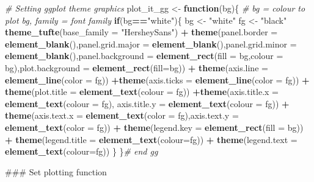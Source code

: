 \documentclass[10,portrait]{article}
\newenvironment{Shaded}{\begin{snugshade}}{\end{snugshade}}
\newcommand{\KeywordTok}[1]{\textcolor[rgb]{0.13,0.29,0.53}{\textbf{#1}}}
\newcommand{\DataTypeTok}[1]{\textcolor[rgb]{0.13,0.29,0.53}{#1}}
\newcommand{\StringTok}[1]{\textcolor[rgb]{0.31,0.60,0.02}{#1}}
\newcommand{\CommentTok}[1]{\textcolor[rgb]{0.56,0.35,0.01}{\textit{#1}}}
\newcommand{\ControlFlowTok}[1]{\textcolor[rgb]{0.13,0.29,0.53}{\textbf{#1}}}
\newcommand{\OperatorTok}[1]{\textcolor[rgb]{0.81,0.36,0.00}{\textbf{#1}}}
\newcommand{\NormalTok}[1]{#1}
\begin{document}
\begin{Shaded}
\begin{Highlighting}[]
\CommentTok{# Setting ggplot theme graphics}
\NormalTok{plot_it_gg <-}\StringTok{ }\ControlFlowTok{function}\NormalTok{(bg)\{ }\CommentTok{# bg = colour to plot bg, family = font family}
  \ControlFlowTok{if}\NormalTok{(bg}\OperatorTok{==}\StringTok{"white"}\NormalTok{)\{}
\NormalTok{    bg <-}\StringTok{ "white"}
\NormalTok{    fg <-}\StringTok{ "black"}
    \KeywordTok{theme_tufte}\NormalTok{(}\DataTypeTok{base_family =} \StringTok{"HersheySans"}\NormalTok{) }\OperatorTok{+}
\StringTok{      }\KeywordTok{theme}\NormalTok{(}\DataTypeTok{panel.border =} \KeywordTok{element_blank}\NormalTok{(),}\DataTypeTok{panel.grid.major =} \KeywordTok{element_blank}\NormalTok{(),}\DataTypeTok{panel.grid.minor =} \KeywordTok{element_blank}\NormalTok{(),}\DataTypeTok{panel.background =} \KeywordTok{element_rect}\NormalTok{(}\DataTypeTok{fill =}\NormalTok{ bg,}\DataTypeTok{colour =}\NormalTok{ bg),}\DataTypeTok{plot.background =} \KeywordTok{element_rect}\NormalTok{(}\DataTypeTok{fill=}\NormalTok{bg)) }\OperatorTok{+}
\StringTok{      }\KeywordTok{theme}\NormalTok{(}\DataTypeTok{axis.line =} \KeywordTok{element_line}\NormalTok{(}\DataTypeTok{color =}\NormalTok{ fg)) }\OperatorTok{+}\KeywordTok{theme}\NormalTok{(}\DataTypeTok{axis.ticks =} \KeywordTok{element_line}\NormalTok{(}\DataTypeTok{color =}\NormalTok{ fg)) }\OperatorTok{+}\StringTok{ }\KeywordTok{theme}\NormalTok{(}\DataTypeTok{plot.title =} \KeywordTok{element_text}\NormalTok{(}\DataTypeTok{colour =}\NormalTok{ fg)) }\OperatorTok{+}\KeywordTok{theme}\NormalTok{(}\DataTypeTok{axis.title.x =} \KeywordTok{element_text}\NormalTok{(}\DataTypeTok{colour =}\NormalTok{ fg), }\DataTypeTok{axis.title.y =} \KeywordTok{element_text}\NormalTok{(}\DataTypeTok{colour =}\NormalTok{ fg)) }\OperatorTok{+}\StringTok{ }\KeywordTok{theme}\NormalTok{(}\DataTypeTok{axis.text.x =} \KeywordTok{element_text}\NormalTok{(}\DataTypeTok{color =}\NormalTok{ fg),}\DataTypeTok{axis.text.y =} \KeywordTok{element_text}\NormalTok{(}\DataTypeTok{color =}\NormalTok{ fg)) }\OperatorTok{+}\StringTok{ }\KeywordTok{theme}\NormalTok{(}\DataTypeTok{legend.key =} \KeywordTok{element_rect}\NormalTok{(}\DataTypeTok{fill =}\NormalTok{ bg)) }\OperatorTok{+}\StringTok{ }\KeywordTok{theme}\NormalTok{(}\DataTypeTok{legend.title =} \KeywordTok{element_text}\NormalTok{(}\DataTypeTok{colour=}\NormalTok{fg)) }\OperatorTok{+}\StringTok{ }\KeywordTok{theme}\NormalTok{(}\DataTypeTok{legend.text =} \KeywordTok{element_text}\NormalTok{(}\DataTypeTok{colour=}\NormalTok{fg))}
\NormalTok{  \}}
\NormalTok{\}}\CommentTok{# end gg}

\NormalTok{### Set plotting function  }
\end{Highlighting}
\end{Shaded}
\end{document}
